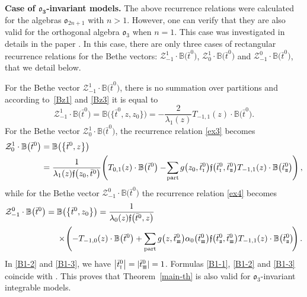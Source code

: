 \documentclass[pdftex]{sigma}
\newcommand{\so}{\scriptscriptstyle \rm I}
\newcommand{\st}{\scriptscriptstyle \rm I\hspace{-1pt}I}
\newcommand{\sth}{\scriptscriptstyle \rm I\hspace{-1pt}I\hspace{-1pt}I}
\newcommand{\bt}{{\bar t}}
\theoremstyle{definition}
\def\BB{{\mathbb{B}}}
\def\r#1{\eqref{#1}}
\def\sk#1{\left(#1\right)}
\def\fgo{\mathfrak{f}}
\def\Z{\mathcal{Z}}
\begin{document}
{\bf Case of $\boldsymbol{\mathfrak{o}_{3}}$-invariant models.}
The above recurrence relations were calculated for the algebras $\mathfrak{o}_{2n+1}$
with $n>1$. However, one can verify that they are also valid for
the orthogonal algebra $\mathfrak{o}_3$ when $n=1$.
This case was investigated in details in the paper \cite{LPRS19}.
In this case, there are only three cases of rectangular recurrence relations
for the Bethe vectors:
$\Z^{1}_{-1}\cdot\BB\bigl(\bt^0\bigr)$, $\Z^{1}_{0}\cdot\BB\bigl(\bt^0\bigr)$ and
$\Z^{0}_{-1}\cdot\BB\bigl(\bt^0\bigr)$, that we detail below.

For the Bethe vector $\Z^{1}_{-1}\cdot\BB\bigl(\bt^0\bigr)$, there is no summation over partitions
 and according to~\r{Bz1} and \r{Bz3}
it is equal to
\begin{equation}\label{B1-1}
\Z^{1}_{-1}\cdot\BB\bigl(\bt^0\bigr)=
\BB\bigl(\bigl\{\bt^0,z,z_0\bigr\}\bigr)= -\frac{2}{\lambda_1(z)} T_{-1,1}(z)\cdot \BB\bigl(\bt^0\bigr) .
\end{equation}
For the Bethe vector $\Z^{1}_{0}\cdot\BB\bigl(\bt^0\bigr)$, the recurrence
relation \r{ex3} becomes
\begin{align}
\Z^{1}_{0}\cdot\BB\bigl(\bt^0\bigr)&=\BB\bigl(\bigl\{\bt^0,z\bigr\}\bigr)\nonumber\\
 &=\frac{1}{\lambda_1(z)\fgo\bigl(z_0,\bt^0\bigr)}\!
\sk{T_{0,1}(z)\cdot\BB\bigl(\bt^0\bigr)-\!\sum_{\rm part}
g\bigl(z_0,\bt^0_{\so}\bigr)\fgo\bigl(\bt^0_{\so},\bt^0_{\st}\bigr) T_{-1,1}(z)\cdot\BB\bigl(\bt^0_{\st}\bigr)} ,\label{B1-2}
\end{align}
while for the Bethe vector $\Z^{0}_{-1}\cdot\BB\bigl(\bt^0\bigr)$
the recurrence relation \r{ex4} becomes
\begin{align}
 \Z^{0}_{-1}\cdot\BB\bigl(\bt^0\bigr)={}&\BB\bigl(\bigl\{\bt^0,z_0\bigr\}\bigr)=\frac{1}{\lambda_0(z)\fgo\bigl(\bt^0,z\bigr)}\nonumber\\
 &\times\!
\sk{-T_{-1,0}(z)\cdot\BB\bigl(\bt^0\bigr)+\sum_{\rm part}
g\bigl(z,\bt^0_{\sth}\bigr) \alpha_0\bigl(\bt^0_{\sth}\bigr) \fgo\bigl(\bt^0_{\st},\bt^0_{\sth}\bigr)
T_{-1,1}(z)\cdot\BB\bigl(\bt^0_{\st}\bigr)\!} .\label{B1-3}
\end{align}
In \r{B1-2} and \r{B1-3}, we have $\big|\bt^0_{\so}\big|=|\bt^0_{\sth}|=1$.
Formulas \r{B1-1}, \r{B1-2} and \r{B1-3} coincide with
\cite[formulas (4.15), (4,19) and (4.20)]{LPRS19}. This proves that
Theorem~\ref{main-th} is also valid for $\mathfrak{o}_3$-invariant integrable models.
\end{document}
